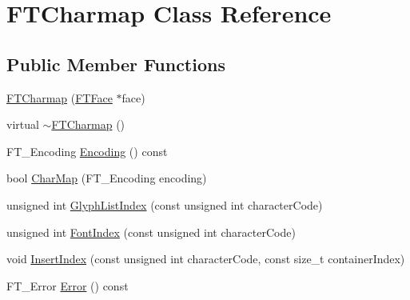 \hypertarget{class_f_t_charmap}{
\section{FTCharmap Class Reference}
\label{class_f_t_charmap}
}
\subsection*{Public Member Functions}
\begin{DoxyCompactItemize}
\item 
\hyperlink{class_f_t_charmap_a9d19837becbc83acf7f56a5980b2b644}{FTCharmap} (\hyperlink{class_f_t_face}{FTFace} $\ast$face)
\item 
virtual \hyperlink{class_f_t_charmap_afcbe1e49ed38810e8b9c2e116ddbbffc}{$\sim$FTCharmap} ()
\item 
FT\_\-Encoding \hyperlink{class_f_t_charmap_a4c119ad30110e00b6b3944288a702c84}{Encoding} () const 
\item 
bool \hyperlink{class_f_t_charmap_a4d182b0faeb7198b4f583b84eaf4cd55}{CharMap} (FT\_\-Encoding encoding)
\item 
unsigned int \hyperlink{class_f_t_charmap_a6084cc8ab267b9974980e14f17227f25}{GlyphListIndex} (const unsigned int characterCode)
\item 
unsigned int \hyperlink{class_f_t_charmap_ab77d9f06a9109608b1734010acecaefd}{FontIndex} (const unsigned int characterCode)
\item 
void \hyperlink{class_f_t_charmap_a374e41b6f8b07efb08e5c173cc707354}{InsertIndex} (const unsigned int characterCode, const size\_\-t containerIndex)
\item 
FT\_\-Error \hyperlink{class_f_t_charmap_a176e217e3e837db5fc4592ceff5ed488}{Error} () const 
\end{DoxyCompactItemize}


